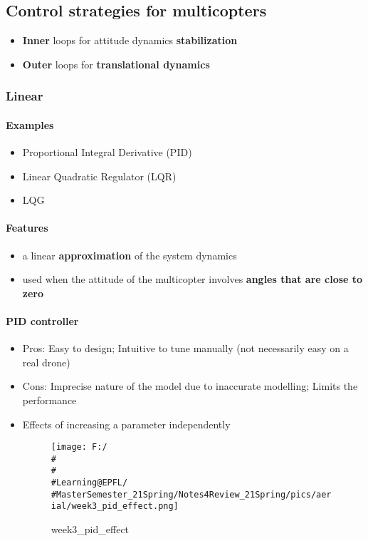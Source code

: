 \documentclass[]{article}
\let\oldparagraph\paragraph
\renewcommand{\paragraph}[1]{\oldparagraph{#1}\mbox{}}
\begin{document}
\subsection{Control strategies for multicopters}\label{header-n702}

\begin{itemize}
\item
  \textbf{Inner} loops for attitude dynamics \textbf{stabilization}
\item
  \textbf{Outer} loops for \textbf{translational dynamics}
\end{itemize}

\subsubsection{Linear}\label{header-n708}

\paragraph{Examples}\label{header-n709}

\begin{itemize}
\item
  Proportional Integral Derivative (PID)
\item
  Linear Quadratic Regulator (LQR)
\item
  LQG
\end{itemize}

\paragraph{Features}\label{header-n717}

\begin{itemize}
\item
  a linear \textbf{approximation} of the system dynamics
\item
  used when the attitude of the multicopter involves \textbf{angles that
  are close to zero}
\end{itemize}

\paragraph{PID controller}\label{header-n723}

\begin{itemize}
\item
  Pros: Easy to design; Intuitive to tune manually (not necessarily easy
  on a real drone)
\item
  Cons: Imprecise nature of the model due to inaccurate modelling;
  Limits the performance
\item
  Effects of increasing a parameter independently

  \begin{figure}
  \centering
  \texttt{[image: F:/\\\#\\\#\\\#Learning@EPFL/\\\#MasterSemester\_21Spring/Notes4Review\_21Spring/pics/aerial/week3\_pid\_effect.png]}
  \caption{week3\_pid\_effect}
  \end{figure}
\end{itemize}
\end{document}
